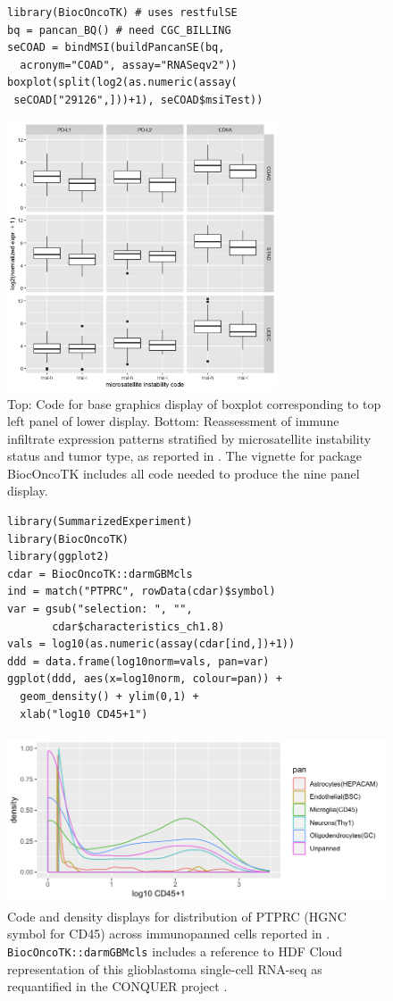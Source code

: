 \documentclass[applications]{gen-bioinformatics}
\begin{document}
\begin{figure}[bb]
\begin{verbatim}
library(BiocOncoTK) # uses restfulSE
bq = pancan_BQ() # need CGC_BILLING
seCOAD = bindMSI(buildPancanSE(bq, 
  acronym="COAD", assay="RNASeqv2"))
boxplot(split(log2(as.numeric(assay(
 seCOAD["29126",]))+1), seCOAD$msiTest))
\end{verbatim}
\includegraphics[height=8.0cm]{imm3x3.png}
\caption{Top: Code for base graphics display of boxplot
corresponding to top left panel of lower display.
Bottom: Reassessment of immune infiltrate expression
patterns stratified by microsatellite instability
status and tumor type, as reported in \cite{Bailey2018}.
The vignette for package BiocOncoTK includes all
code needed to produce the nine panel display.}
\label{pancanPanel}
\end{figure}



\begin{figure}[bb]
\begin{verbatim}
library(SummarizedExperiment)
library(BiocOncoTK)
library(ggplot2)
cdar = BiocOncoTK::darmGBMcls
ind = match("PTPRC", rowData(cdar)$symbol)
var = gsub("selection: ", "", 
       cdar$characteristics_ch1.8)
vals = log10(as.numeric(assay(cdar[ind,])+1))
ddd = data.frame(log10norm=vals, pan=var)
ggplot(ddd, aes(x=log10norm, colour=pan)) + 
  geom_density() + ylim(0,1) + 
  xlab("log10 CD45+1")
\end{verbatim}
\includegraphics[height=5.0cm]{darmDens.png}
\caption{Code and density displays for
distribution of PTPRC (HGNC symbol for CD45) across immunopanned
cells reported in \cite{Darmanis2017}.
\texttt{BiocOncoTK::darmGBMcls} includes
a reference to HDF Cloud representation of
this glioblastoma single-cell RNA-seq
as requantified in the CONQUER project \citep{Soneson2018}.}
\label{hdffig}
\end{figure}
\end{document}
